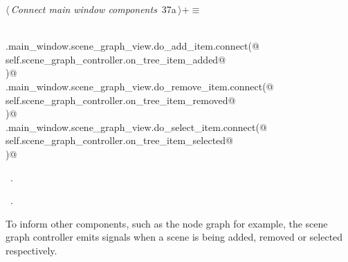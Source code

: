 \documentclass[
    a4paper,      %
    10pt,         %
    openright,    %
    notitlepage,  %
    parskip=half, %
]{scrreprt}       %
\theoremstyle{definition}                    %
\begin{document}
\begin{flushleft} \small
\begin{minipage}{\linewidth}\label{scrap44}\raggedright\small
{} $\langle\,${\itshape Connect main window components}\nobreak\ {\footnotesize {37a}}$\,\rangle+\equiv$
\vspace{-1ex}
\begin{list}{}{} \item
\mbox{}\lstinline@@\\
\mbox{}\lstinline@self.main_window.scene_graph_view.do_add_item.connect(@\\
\mbox{}\lstinline@    self.scene_graph_controller.on_tree_item_added@\\
\mbox{}\lstinline@)@\\
\mbox{}\lstinline@self.main_window.scene_graph_view.do_remove_item.connect(@\\
\mbox{}\lstinline@    self.scene_graph_controller.on_tree_item_removed@\\
\mbox{}\lstinline@)@\\
\mbox{}\lstinline@self.main_window.scene_graph_view.do_select_item.connect(@\\
\mbox{}\lstinline@    self.scene_graph_controller.on_tree_item_selected@\\
\mbox{}\lstinline@)@{\NWsep}
\end{list}
\vspace{-1.5ex}
\footnotesize
\begin{list}{}{\setlength{\itemsep}{-\parsep}\setlength{\itemindent}{-\leftmargin}}
\item \NWtxtMacroDefBy\ .
\item \NWtxtMacroRefIn\ .

\item{}
\end{list}
\end{minipage}\vspace{4ex}
\end{flushleft}
To inform other components, such as the node graph for example, the scene graph
controller emits signals when a scene is being added, removed or selected
respectively.
\end{document}
